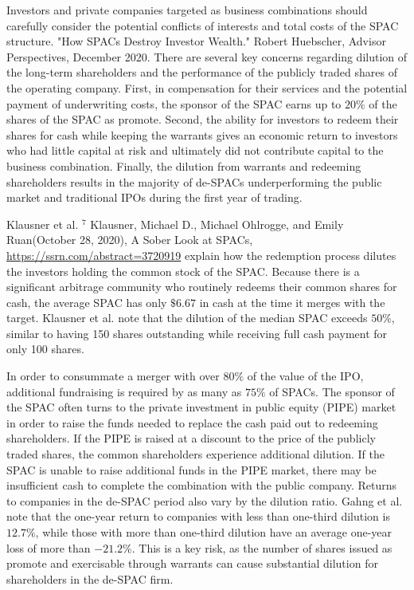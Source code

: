 \documentclass[11pt]{article}
\begin{document}
Investors and private companies targeted as business combinations should carefully consider the potential conflicts of interests and total costs of the SPAC structure. "How SPACs Destroy Investor Wealth." Robert Huebscher, Advisor Perspectives, December 2020. There are several key concerns regarding dilution of the long-term shareholders and the performance of the publicly traded shares of the operating company. First, in compensation for their services and the potential payment of underwriting costs, the sponsor of the SPAC earns up to $20 \%$ of the shares of the SPAC as promote. Second, the ability for investors to redeem their shares for cash while keeping the warrants gives an economic return to investors who had little capital at risk and ultimately did not contribute capital to the business combination. Finally, the dilution from warrants and redeeming shareholders results in the majority of de-SPACs underperforming the public market and traditional IPOs during the first year of trading.

Klausner et al. ${ }^{7}$ Klausner, Michael D., Michael Ohlrogge, and Emily Ruan(October 28, 2020), A Sober Look at SPACs, \href{https://ssrn.com/abstract=3720919}{https://ssrn.com/abstract=3720919} explain how the redemption process dilutes the investors holding the common stock of the SPAC. Because there is a significant arbitrage community who routinely redeems their common shares for cash, the average SPAC has only $\$ 6.67$ in cash at the time it merges with the target. Klausner et al. note that the dilution of the median SPAC exceeds $50 \%$, similar to having 150 shares outstanding while receiving full cash payment for only 100 shares.

In order to consummate a merger with over $80 \%$ of the value of the IPO, additional fundraising is required by as many as $75 \%$ of SPACs. The sponsor of the SPAC often turns to the private investment in public equity (PIPE) market in order to raise the funds needed to replace the cash paid out to redeeming shareholders. If the PIPE is raised at a discount to the price of the publicly traded shares, the common shareholders experience additional dilution. If the SPAC is unable to raise additional funds in the PIPE market, there may be insufficient cash to complete the combination with the public company. Returns to companies in the de-SPAC period also vary by the dilution ratio. Gahng et al. note that the one-year return to companies with less than one-third dilution is $12.7 \%$, while those with more than one-third dilution have an average one-year loss of more than $-21.2 \%$. This is a key risk, as the number of shares issued as promote and exercisable through warrants can cause substantial dilution for shareholders in the de-SPAC firm.
\end{document}
